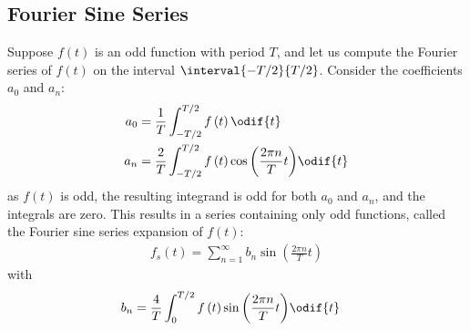 \documentclass{article}
\begin{document}
\subsection{Fourier Sine Series}
Suppose \(f\left( t \right)\) is an odd function with period \(T\),
and let us compute the Fourier series of \(f\left( t \right)\) on the
interval \(\interval{-T/2}{T/2}\). Consider the coefficients \(a_0\)
and \(a_n\):
\begin{align*}
    a_0 & = \frac{1}{T} \int_{-T/2}^{T/2} f\left( t \right) \odif{t} \\
    a_n & = \frac{2}{T} \int_{-T/2}^{T/2} f\left( t \right) \cos{\left( \frac{2\pi n}{T} t \right)} \odif{t}
\end{align*}
as \(f\left( t \right)\) is odd, the resulting integrand is odd for
both \(a_0\) and \(a_n\), and the integrals are zero. This results in a
series containing only odd functions, called the Fourier sine series
expansion of \(f\left( t \right)\):
\begin{align*}
    f_s\left( t \right) = \sum_{n=1}^{\infty} b_n \sin{\left( \frac{2\pi n}{T} t \right)}
\end{align*}
with
\begin{align*}
    b_n & = \frac{4}{T} \int_{0}^{T/2} f\left( t \right) \sin{\left( \frac{2\pi n}{T} t \right)} \odif{t}
\end{align*}
\end{document}

